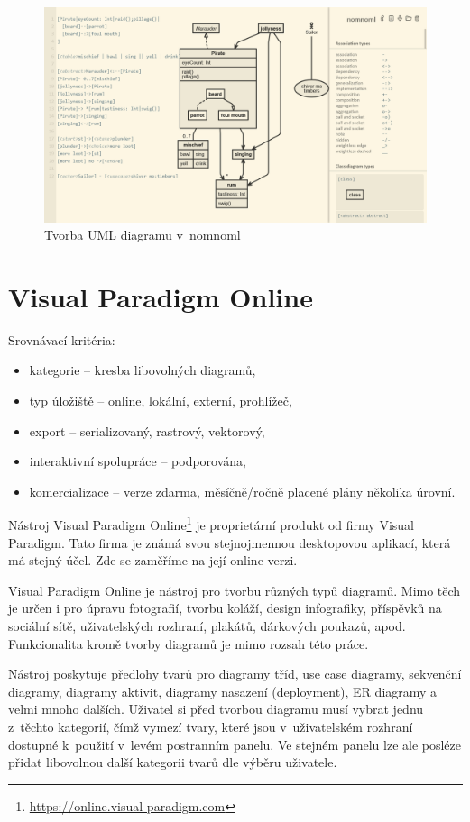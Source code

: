 \begin{figure}
  \centering
  \includegraphics[width = \textwidth]{../img/nomnoml.png}
  \caption{Tvorba UML diagramu v~nomnoml}
  \label{fig:nomnoml}
\end{figure}

\section{Visual Paradigm Online}

Srovnávací kritéria:
\begin{itemize}
  \item kategorie -- kresba libovolných diagramů,
  \item typ úložiště -- online, lokální, externí, prohlížeč,
  \item export -- serializovaný, rastrový, vektorový,
  \item interaktivní spolupráce -- podporována,
  \item komercializace -- verze zdarma, měsíčně/ročně placené plány několika úro\-vní.
\end{itemize}

Nástroj Visual Paradigm Online\footnote{\url{https://online.visual-paradigm.com}} je proprietární produkt od firmy Visual Paradigm.
Tato firma je známá svou stejnojmennou desktopovou aplikací, která má stejný účel. Zde se zaměříme na její online verzi.

Visual Paradigm Online je nástroj pro tvorbu různých typů diagramů.
Mimo těch je určen i pro úpravu fotografií, tvorbu koláží, design infografiky, příspěvků na sociální sítě, uživatelských rozhraní, plakátů, dárkových poukazů, apod.
Funkcionalita kromě tvorby diagramů je mimo rozsah této práce.

Nástroj poskytuje předlohy tvarů pro diagramy tříd, use case diagramy, sekvenční diagramy, diagramy aktivit, diagramy nasazení (deployment), ER diagramy a velmi mnoho dalších.
Uživatel si před tvorbou diagramu musí vybrat jednu z~těchto kategorií, čímž vymezí tvary, které jsou v~uživatelském rozhraní dostupné k~použití v~levém postranním panelu.
Ve stejném panelu lze ale posléze přidat libovolnou další kategorii tvarů dle výběru uživatele.

